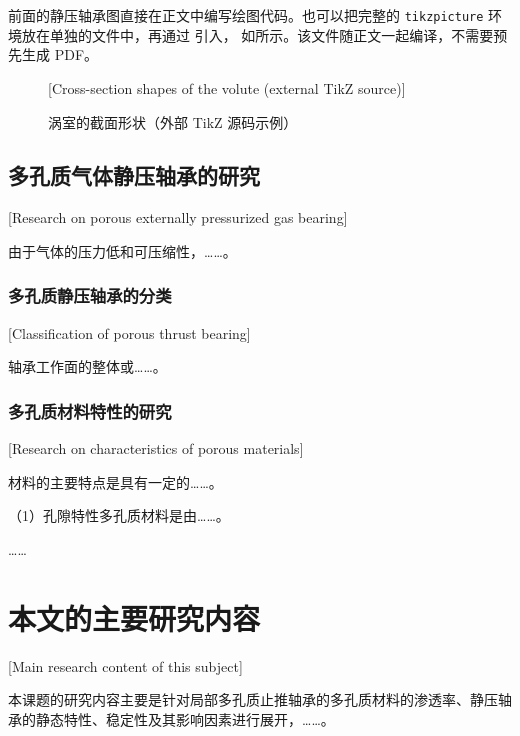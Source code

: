前面的静压轴承图直接在正文中编写绘图代码。也可以把完整的
\texttt{tikzpicture} 环境放在单独的文件中，再通过 \verb|| 引入，
如所示。该文件随正文一起编译，不需要预先生成 PDF。

\begin{figure}[!htbp]
  \centering
  \resizebox{.95\linewidth}{!}{}
  \caption{涡室的截面形状（外部 TikZ 源码示例）}[Cross-section shapes of the volute (external TikZ source)]
  \label{fig:volute-input}
\end{figure}

\subsection{多孔质气体静压轴承的研究}[Research on porous externally pressurized gas bearing]

由于气体的压力低和可压缩性，……。

\subsubsection{多孔质静压轴承的分类}[Classification of porous thrust bearing]

轴承工作面的整体或……。

\subsubsection{多孔质材料特性的研究}[Research on characteristics of porous materials]

材料的主要特点是具有一定的……。

（1）孔隙特性\quad 多孔质材料是由……。

……

\section{本文的主要研究内容}[Main research content of this subject]

本课题的研究内容主要是针对局部多孔质止推轴承的多孔质材料的渗透率、静压轴承的静态特性、稳定性及其影响因素进行展开，……。
